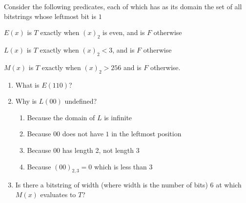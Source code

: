 Consider the following predicates, each of which has 
as its domain the set of all bitstrings whose leftmost bit is $1$

$E(x)$ is $T$ exactly when $(x)_{2}$ is even, and is $F$ otherwise

$L(x)$ is $T$ exactly when $(x)_2 < 3$, and is $F$ otherwise

$M(x)$ is $T$ exactly when $(x)_2 > 256$ and is $F$ otherwise.

\begin{enumerate}
\item What is $E(110)$?
\item Why is $L( 00)$ undefined?
\begin{enumerate}
\item Because the domain of $L$ is infinite
\item Because $00$ does not have $1$ in the leftmost position
\item Because $00$ has length 2, not length 3
\item Because $(00)_{2,3} = 0$ which is less than $3$
\end{enumerate}
\item Is there a bitstring of width (where width is the number of bits) $6$ at which $M(x)$ evaluates 
to $T$?
\end{enumerate}
